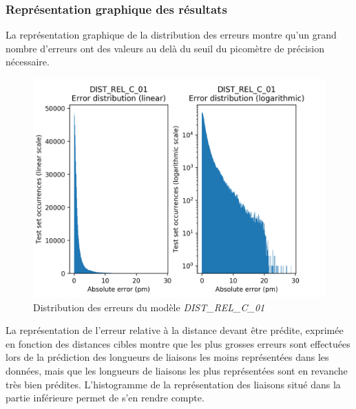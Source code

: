 \subsubsection{Représentation graphique des résultats}
\par La représentation graphique de la distribution des erreurs montre qu'un grand nombre d'erreurs ont des valeurs au delà du seuil du picomètre de précision nécessaire.

\begin{figure}[!h]
	\centering
	
	\includegraphics[scale=0.7]{../figures/DIST_REL_C_01/DIST_REL_C_01_distrib_rmse_val.png}	
	
	\caption{Distribution des erreurs du modèle \emph{DIST\_REL\_C\_01}}
\end{figure}

\par La représentation de l'erreur relative à la distance devant être prédite, exprimée en fonction des distances cibles montre que les plus grosses erreurs sont effectuées lors de la prédiction des longueurs de liaisons les moins représentées dans les données, mais que les longueurs de liaisons les plus représentées sont en revanche très bien prédites. L'histogramme de la représentation des liaisons situé dans la partie inférieure permet de s'en rendre compte.

